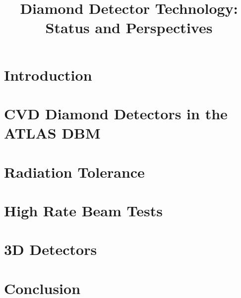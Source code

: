 \documentclass{PoS}
\title{Diamond Detector Technology: Status and Perspectives}
\begin{document}
\section{Introduction}


\section{\ac{CVD} Diamond Detectors in the ATLAS \ac{DBM}}


\section{Radiation Tolerance}\label{rad}


\section{High Rate Beam Tests}


\section{3D Detectors}\label{3D}


\section{Conclusion}






\end{document}
